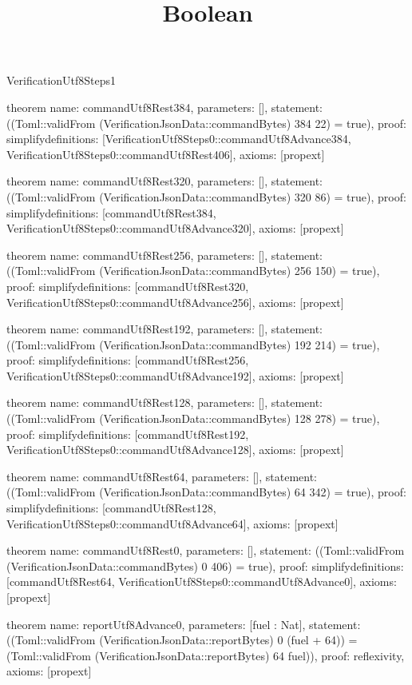 \begin{lexlean}{VerificationUtf8Steps1}
\title{Boolean}
\begin{semanticmodule}

theorem{
  name: commandUtf8Rest384,
  parameters: [],
  statement: ((Toml::validFrom (VerificationJsonData::commandBytes) 384 22) = true),
  proof: simplify{definitions: [VerificationUtf8Steps0::commandUtf8Advance384, VerificationUtf8Steps0::commandUtf8Rest406]},
  axioms: [propext]
}

theorem{
  name: commandUtf8Rest320,
  parameters: [],
  statement: ((Toml::validFrom (VerificationJsonData::commandBytes) 320 86) = true),
  proof: simplify{definitions: [commandUtf8Rest384, VerificationUtf8Steps0::commandUtf8Advance320]},
  axioms: [propext]
}

theorem{
  name: commandUtf8Rest256,
  parameters: [],
  statement: ((Toml::validFrom (VerificationJsonData::commandBytes) 256 150) = true),
  proof: simplify{definitions: [commandUtf8Rest320, VerificationUtf8Steps0::commandUtf8Advance256]},
  axioms: [propext]
}

theorem{
  name: commandUtf8Rest192,
  parameters: [],
  statement: ((Toml::validFrom (VerificationJsonData::commandBytes) 192 214) = true),
  proof: simplify{definitions: [commandUtf8Rest256, VerificationUtf8Steps0::commandUtf8Advance192]},
  axioms: [propext]
}

theorem{
  name: commandUtf8Rest128,
  parameters: [],
  statement: ((Toml::validFrom (VerificationJsonData::commandBytes) 128 278) = true),
  proof: simplify{definitions: [commandUtf8Rest192, VerificationUtf8Steps0::commandUtf8Advance128]},
  axioms: [propext]
}

theorem{
  name: commandUtf8Rest64,
  parameters: [],
  statement: ((Toml::validFrom (VerificationJsonData::commandBytes) 64 342) = true),
  proof: simplify{definitions: [commandUtf8Rest128, VerificationUtf8Steps0::commandUtf8Advance64]},
  axioms: [propext]
}

theorem{
  name: commandUtf8Rest0,
  parameters: [],
  statement: ((Toml::validFrom (VerificationJsonData::commandBytes) 0 406) = true),
  proof: simplify{definitions: [commandUtf8Rest64, VerificationUtf8Steps0::commandUtf8Advance0]},
  axioms: [propext]
}

theorem{
  name: reportUtf8Advance0,
  parameters: [fuel : Nat],
  statement: ((Toml::validFrom (VerificationJsonData::reportBytes) 0 (fuel + 64)) = (Toml::validFrom (VerificationJsonData::reportBytes) 64 fuel)),
  proof: reflexivity{},
  axioms: [propext]
}

\end{semanticmodule}
\end{lexlean}
